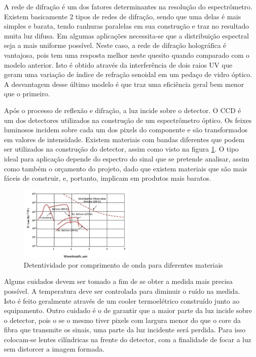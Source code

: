 \documentclass[article]{IEEEtran}
\begin{document}
A rede de difração é um dos fatores determinantes na resolução do espectrômetro. Existem basicamente 2 tipos de redes de difração, sendo que uma delas é mais simples e barata, tendo ranhuras paralelas em sua construção e traz no resultado muita luz difusa. Em algumas aplicações necessita-se que a distribuição espectral seja a mais uniforme possível. Neste caso, a rede de difração holográfica é vantajosa, pois tem uma resposta melhor neste quesito quando comparado com o modelo anterior. Isto é obtido através da interferência de dois raios UV que geram uma variação de índice de refração senoidal em um pedaço de vidro óptico. A desvantagem desse último modelo é que traz uma eficiência geral bem menor que o primeiro.

Após o processo de reflexão e difração, a luz incide sobre o detector. O CCD é um dos detectores utilizados na construção de um espectrômetro óptico. Os feixes luminosos incidem sobre cada um dos pixels do componente e são transformados em valores de intensidade. Existem materiais com bandas diferentes que podem ser utilizados na construção do detector, assim como visto na figura \ref{fig:materiais_detector}. O tipo ideal para aplicação depende do espectro do sinal que se pretende analisar, assim como também o orçamento do projeto, dado que existem materiais que são mais fáceis de construir, e, portanto, implicam em produtos mais baratos.

\begin{figure}[H]
	\includegraphics[width=0.5\textwidth]{images/banda_ccd.jpg}
	\caption{Detentividade por comprimento de onda para diferentes materiais}
	\label{fig:materiais_detector}
\end{figure} 

Alguns cuidados devem ser tomado a fim de se obter a medida mais precisa possível. A temperatura deve ser controlada para diminuir o ruído na medida. Isto é feito geralmente através de um cooler termoelétrico construído junto ao equipamento. Outro cuidado é o de garantir que a maior parte da luz incide sobre o detector, pois o se o mesmo tiver pixels com largura menor do que o core da fibra que transmite os sinais, uma parte da luz incidente será perdida. Para isso colocam-se lentes cilíndricas na frente do detector, com a finalidade de focar a luz sem distorcer a imagem formada.
\end{document}
